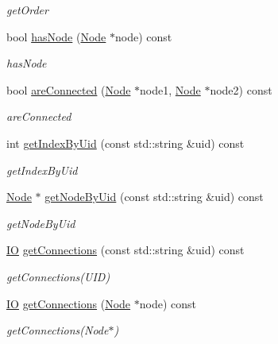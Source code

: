 \begin{DoxyCompactItemize}
\begin{DoxyCompactList}\small\item\em get\+Order \end{DoxyCompactList}\item 
bool \mbox{\hyperlink{class_graph_a45c6a79b3251a56674cbabf980f8cea7}{has\+Node}} (\mbox{\hyperlink{class_node}{Node}} $\ast$node) const
\begin{DoxyCompactList}\small\item\em has\+Node \end{DoxyCompactList}\item 
bool \mbox{\hyperlink{class_graph_af392b6a490dee43fb2448b2d969353b0}{are\+Connected}} (\mbox{\hyperlink{class_node}{Node}} $\ast$node1, \mbox{\hyperlink{class_node}{Node}} $\ast$node2) const
\begin{DoxyCompactList}\small\item\em are\+Connected \end{DoxyCompactList}\item 
int \mbox{\hyperlink{class_graph_a2d8d8d9edb8a496d5c252132cdbbbc08}{get\+Index\+By\+Uid}} (const std\+::string \&uid) const
\begin{DoxyCompactList}\small\item\em get\+Index\+By\+Uid \end{DoxyCompactList}\item 
\mbox{\hyperlink{class_node}{Node}} $\ast$ \mbox{\hyperlink{class_graph_aa9fa7bf3cf75a4239504607a442aebba}{get\+Node\+By\+Uid}} (const std\+::string \&uid) const
\begin{DoxyCompactList}\small\item\em get\+Node\+By\+Uid \end{DoxyCompactList}\item 
\mbox{\hyperlink{_graph_8h_a383232190011cffd7d1fb05d72e89928}{IO}} \mbox{\hyperlink{class_graph_a163656854e289f8dbdf037683d581dec}{get\+Connections}} (const std\+::string \&uid) const
\begin{DoxyCompactList}\small\item\em get\+Connections(\+U\+I\+D) \end{DoxyCompactList}\item 
\mbox{\hyperlink{_graph_8h_a383232190011cffd7d1fb05d72e89928}{IO}} \mbox{\hyperlink{class_graph_ac925af39108ceec409a3083bc784604e}{get\+Connections}} (\mbox{\hyperlink{class_node}{Node}} $\ast$node) const
\begin{DoxyCompactList}\small\item\em get\+Connections(\+Node$\ast$) \end{DoxyCompactList}\item 

\end{DoxyCompactItemize}
